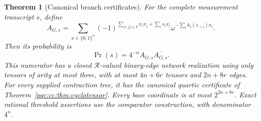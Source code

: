 \documentclass[11pt,letterpaper]{article}
\numberwithin{equation}{section}
\newtheorem{theorem}{Theorem}[section]
\theoremstyle{definition}
\theoremstyle{remark}
\newcommand{\Prob}{\Pr}
\newcommand{\calR}{\mathcal R}
\begin{document}
\begin{theorem}[Canonical branch certificates]
\label{pqc:cc:thm:graphstate}
For the complete measurement transcript $s$, define
\begin{equation}
 A_{G,s}=\sum_{x\in\{0,1\}^n}
  (-1)^{\sum_{\{i,j\}\in F}x_i x_j+\sum_i s_i x_i}
  \omega^{-\sum_i k_i(s_{<i})x_i}.
\label{pqc:cc:eq:graphbranch}
\end{equation}
Then its probability is
\begin{equation}
 \Prob(s)=4^{-n}A_{G,s}\overline{A_{G,s}}.
\label{pqc:cc:eq:graphprobability}
\end{equation}
This numerator has a closed $\calR$-valued binary-edge network realization
using only tensors of arity at most three, with at most $4n+6r$ tensors and
$2n+8r$ edges. For every supplied contraction tree, it has the canonical
quartic certificate of Theorem~\ref{pqc:cc:thm:cyclotensor}. Every base coordinate is
at most $2^{2n+8r}$. Exact rational threshold assertions use the comparator
construction, with denominator $4^n$.
\end{theorem}
\end{document}
